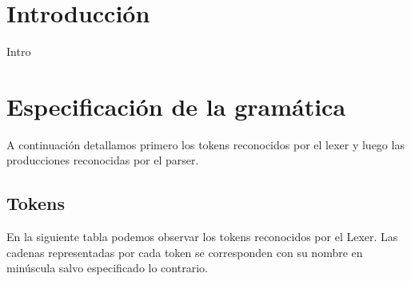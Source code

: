 \documentclass[a4paper,8pt]{article}
\begin{document}
\pagestyle{myheadings}
\maketitle
\thispagestyle{empty}
\tableofcontents


\newpage

\section{Introducción}
Intro

\section{Especificación de la gramática}
A continuación detallamos primero los tokens reconocidos por el lexer y luego las producciones reconocidas por el parser.
\subsection{Tokens}
En la siguiente tabla podemos observar los tokens reconocidos por el Lexer. Las cadenas representadas por cada token se corresponden con su nombre en minúscula salvo especificado lo contrario.
\end{document}

